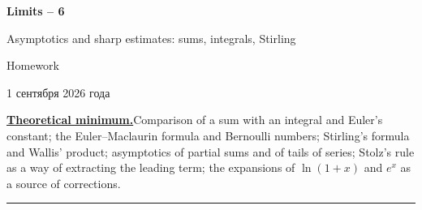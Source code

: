 \documentclass[11pt,a4paper]{article}
\begin{document}
\begin{center}
{\huge\bfseries Limits -- 6\par}\vspace{1.2em}
{\Large Asymptotics and sharp estimates: sums, integrals, Stirling\par}\vspace{0.8em}
{\Large Homework\par}\vspace{0.8em}
{\foreignlanguage{russian}{1 сентября 2026 года}\par}
\end{center}

\noindent\textbf{\underline{Theoretical minimum.}}\quad Comparison of a sum with an integral and Euler's constant; the
Euler--Maclaurin formula and Bernoulli numbers; Stirling's formula and Wallis' product; asymptotics
of partial sums and of tails of series; Stolz's rule as a way of extracting the leading term; the
expansions of $\ln(1+x)$ and $e^x$ as a source of corrections.

\noindent\rule{\textwidth}{0.4pt}\par\medskip
\end{document}
